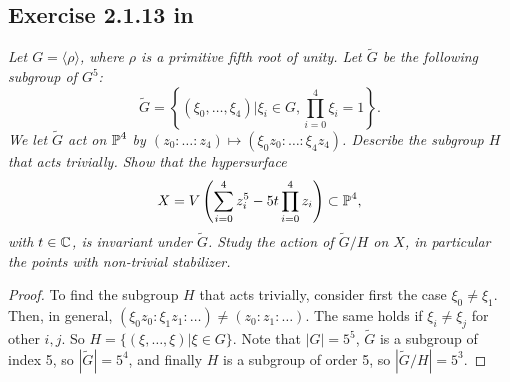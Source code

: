 \documentclass{article}
\begin{document}
\subsection*{Exercise 2.1.13 in \cite{Huy}}
\emph{Let $G = \langle \rho \rangle$, where $\rho$ is a primitive fifth root of unity. Let $\tilde G$ be the following
subgroup of $G^5$:}
\[	\tilde G = \left\{ (\xi_0, \dots, \xi_4) | \xi_i \in G, \prod_{i=0}^4 \xi_i = 1 \right\}.	\]
\emph{We let $\tilde G$ act on $\operatorname{\mathbb{P}}^4$ by $(z_0:\dots:z_4) \mapsto (\xi_0 z_0 : \dots : \xi_4 z_4)$. Describe the
subgroup $H$ that acts trivially. Show that the hypersurface}
\[	X = V \left( \sum_{i=0}^4 z_i^5 - 5t \prod_{i=0}^4 z_i \right) \subset \operatorname{\mathbb{P}}^4,	\]
\emph{with $t \in \mathbb{C}$, is invariant under $\tilde G$. Study the action of $\tilde G / H$ on $X$, in particular the
points with non-trivial stabilizer.}
\begin{proof}
To find the subgroup $H$ that acts trivially, consider first the case $\xi_0 \neq \xi_1$. Then, in general,
$(\xi_0 z_0 : \xi_1 z_1 : \dots) \neq (z_0 : z_1 : \dots)$. The same holds if
$\xi_i \neq \xi_j$ for other $i,j$. So $H = \{(\xi, \dots, \xi) | \xi \in G\}$. Note that $|G| = 5^5$, $\tilde G$
is a subgroup of index 5, so $|\tilde G| = 5^4$, and finally $H$ is a subgroup of order 5, so $|\tilde G /H| = 5^3$.


\end{proof}
\end{document}
